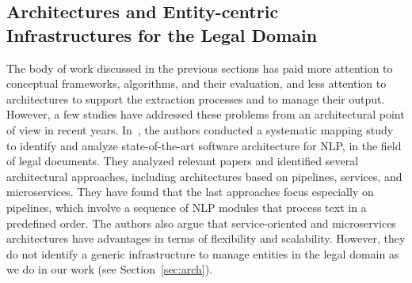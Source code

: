 




\subsection{Architectures and Entity-centric Infrastructures for the Legal Domain}
\label{sec:related_arch}
The body of work discussed in the previous sections has paid more attention to conceptual frameworks, algorithms, and their evaluation, and less attention to architectures to support the extraction processes and to manage their output.   
However, a few studies have addressed these problems from an architectural point of view in recent years. In~\cite{PAUZI2023111616}, the authors conducted a systematic mapping study to identify and analyze state-of-the-art software architecture for NLP, in the field of legal documents. They analyzed relevant papers and identified several architectural approaches, including architectures based on pipelines, services, and microservices. 
They have found that the last approaches focus especially on pipelines, which involve a sequence of NLP modules that process text in a predefined order. The authors also argue that service-oriented and microservices architectures have advantages in terms of flexibility and scalability. However, they do not identify a generic infrastructure to manage entities in the legal domain as we do in our work (see Section~\ref{sec:arch}). 

